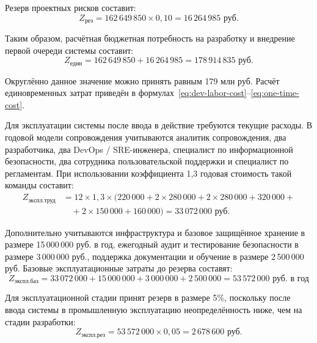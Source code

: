 Резерв проектных рисков составит:
\begin{equation}
Z_{\text{рез}} = 162\,649\,850 \times 0{,}10 = 16\,264\,985 \text{ руб.}
\label{eq:project-reserve}
\end{equation}

Таким образом, расчётная бюджетная потребность на разработку и внедрение первой очереди системы составит:
\begin{equation}
Z_{\text{един}} = 162\,649\,850 + 16\,264\,985 = 178\,914\,835 \text{ руб.}
\label{eq:one-time-cost}
\end{equation}

Округлённо данное значение можно принять равным 179 млн руб. Расчёт единовременных затрат приведён в формулах~\eqref{eq:dev-labor-cost}--\eqref{eq:one-time-cost}.

Для эксплуатации системы после ввода в действие требуются текущие расходы. В годовой модели сопровождения учитываются аналитик сопровождения, два разработчика, два DevOps / SRE-инженера, специалист по информационной безопасности, два сотрудника пользовательской поддержки и специалист по регламентам. При использовании коэффициента 1{,}3 годовая стоимость такой команды составит:
\begin{equation}
\begin{split}
Z_{\text{экспл.труд}} &=
12 \times 1{,}3 \times
(220\,000 + 2 \times 280\,000 + 2 \times 280\,000 + 320\,000 + \\
&\quad + 2 \times 150\,000 + 160\,000)
= 33\,072\,000 \text{ руб.}
\end{split}
\label{eq:operation-labor-cost}
\end{equation}

Дополнительно учитываются инфраструктура и базовое защищённое хранение в размере 15\,000\,000 руб. в год, ежегодный аудит и тестирование безопасности в размере 3\,000\,000 руб., поддержка документации и обучение в размере 2\,500\,000 руб. Базовые эксплуатационные затраты до резерва составят:
\begin{equation}
Z_{\text{экспл.баз}} =
33\,072\,000 + 15\,000\,000 + 3\,000\,000 + 2\,500\,000 =
53\,572\,000 \text{ руб. в год}
\label{eq:operation-base-cost}
\end{equation}

Для эксплуатационной стадии принят резерв в размере 5\%, поскольку после ввода системы в промышленную эксплуатацию неопределённость ниже, чем на стадии разработки:
\begin{equation}
Z_{\text{экспл.рез}} = 53\,572\,000 \times 0{,}05 = 2\,678\,600 \text{ руб.}
\label{eq:operation-reserve}
\end{equation}

